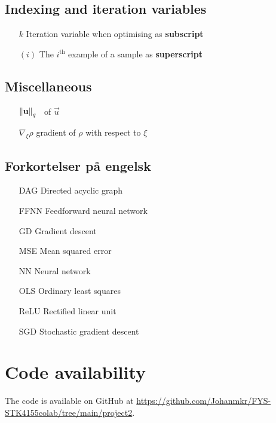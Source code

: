 \subsection{Indexing and iteration variables}
\begin{itemize}
    \item[$k$] Iteration variable when optimising as \textbf{subscript}
    \item[$(i)$] The $i^\mathrm{th}$ example of a sample as \textbf{superscript}
\end{itemize}


\subsection{Miscellaneous}

\begin{itemize}
    \item[$\norm{\mathbf{u}}_q$] \lnorm[q]\, of $\vec{u}$
    \item[$\nabla_{\!\xi} \rho$] gradient of $\rho$ with respect to $\xi$
\end{itemize}

\subsection{Forkortelser på engelsk}
\begin{itemize}
    \item[DAG] Directed acyclic graph
    \item[FFNN] Feedforward neural network
    \item[GD] Gradient descent
    \item[MSE] Mean squared error 
    \item[NN] Neural network 
    \item[OLS] Ordinary least squares 
    \item[ReLU] Rectified linear unit
    \item[SGD] Stochastic gradient descent 
\end{itemize}








\section*{Code availability}
The code is available on GitHub at \url{https://github.com/Johanmkr/FYS-STK4155colab/tree/main/project2}.





